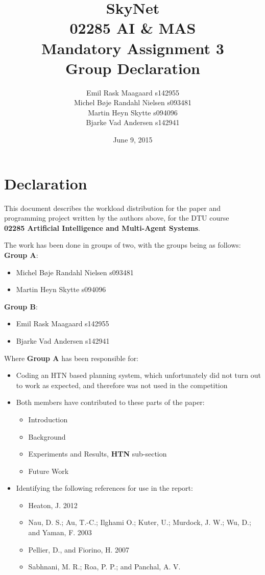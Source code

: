 \documentclass[letterpaper]{article}
\title{SkyNet\\02285 AI \& MAS\\Mandatory Assignment 3\\Group Declaration}
\date{June 9, 2015}
\author{Emil Rask Maagaard s142955\\Michel B\o je Randahl Nielsen s093481 
\\Martin Heyn Skytte s094096\\Bjarke Vad Andersen s142941}
\begin{document}
\maketitle
\section*{Declaration}
This document describes the workload distribution for the paper and programming project written by the
authors above, for the DTU course\\
\textbf{02285 Artificial Intelligence and Multi-Agent Systems}.

The work has been done in groups of two, with the groups being as follows:\\
\textbf{Group A}:
\begin{itemize}
\item Michel B\o je Randahl Nielsen s093481 
\item Martin Heyn Skytte s094096
\end{itemize}
\textbf{Group B}:
\begin{itemize}
\item Emil Rask Maagaard s142955
\item Bjarke Vad Andersen s142941
\end{itemize}

Where \textbf{Group A} has been responsible for:
\begin{itemize}
\item Coding an HTN based planning system, which unfortunately did not turn out
  to work as expected, and therefore was not used in the competition
\item Both members have contributed to these parts of the paper:
  \begin{itemize}
  \item Introduction
  \item Background
  \item Experiments and Results, \textbf{HTN} sub-section
  \item Future Work
  \end{itemize}
\item Identifying the following references for use in the report:
  \begin{itemize}
  \item Heaton, J. 2012
  \item Nau, D. S.; Au, T.-C.; Ilghami O.; Kuter, U.; Murdock, J. W.; Wu, D.; and
  Yaman, F. 2003
  \item Pellier, D., and Fiorino, H. 2007
  \item Sabhnani, M. R.; Roa, P. P.; and Panchal, A. V.
  \end{itemize}
\end{itemize}
\end{document}
